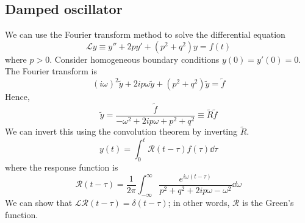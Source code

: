 \subsection{Damped oscillator}
We can use the Fourier transform method to solve the differential equation
\[
	\mathcal L y \equiv y'' + 2py' + (p^2 + q^2)y = f(t)
\]
where \( p > 0 \).
Consider homogeneous boundary conditions \( y(0) = y'(0) = 0 \).
The Fourier transform is
\[
	(i\omega)^2 \widetilde y + 2 i p \omega \widetilde y + (p^2 + q^2) \widetilde y = \widetilde f
\]
Hence,
\[
	\widetilde y = \frac{\widetilde f}{-\omega^2 + 2ip\omega + p^2 + q^2} \equiv \widetilde R \widetilde f
\]
We can invert this using the convolution theorem by inverting \( \widetilde R \).
\[
	y(t) = \int_0^t \mathcal R(t-\tau) f(\tau) \dd{\tau}
\]
where the response function is
\[
	\mathcal R(t - \tau) = \frac{1}{2\pi} \int_{-\infty}^\infty \frac{e^{i\omega(t-\tau)}}{p^2 + q^2 + 2ip\omega - \omega^2} \dd{\omega}
\]
We can show that \( \mathcal L \mathcal R(t-\tau) = \delta(t-\tau) \); in other words, \( \mathcal R \) is the Green's function.

